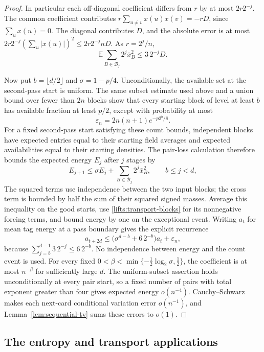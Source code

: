 \begin{proof}
In particular each off-diagonal coefficient differs from $r$ by at
most $2r2^{-j}$. The common coefficient contributes
$r\sum_{u\ne v}x(u)x(v)=-rD$, since $\sum_u x(u)=0$.
The diagonal contributes $D$, and the absolute error is at most
$2r2^{-j}(\sum_u|x(u)|)^2\le2r2^{-j}nD$. As $r=2^j/n$,
\begin{equation}
 \mathbb E\sum_{B\in\mathcal B_j}2^j\bar x_B^2\le3\,2^{-j}D.
 \label{lifts:transport-blocks}
\end{equation}

Now put $b=\lfloor d/2\rfloor$ and $\sigma=1-p/4$.
Unconditionally, the available set at the second-pass start is uniform.
The same subset estimate used above and a union bound over fewer than
$2n$ blocks show that every starting block of level at least $b$ has
available fraction at least $p/2$, except with probability at most
\[
 \varepsilon_n=2n(n+1)e^{-p2^b/8}.
\]
For a fixed second-pass start satisfying these count bounds, independent
blocks have expected entries equal to their starting field averages
and expected availabilities equal to their starting densities.
The pair-loss calculation therefore bounds the expected energy $E_j$
after $j$ stages by
\begin{equation}
 E_{j+1}\le\sigma E_j+\sum_{B\in\mathcal B_j}2^j\bar x_B^2,
 \qquad b\le j<d,
 \label{lifts:transport-stage}
\end{equation}
The squared terms use independence between the two input blocks; the
cross term is bounded by half the sum of their squared signed masses.
Average this inequality on the good starts, use
\eqref{lifts:transport-blocks} for its nonnegative forcing terms, and
bound energy by one on the exceptional event. Writing $a_t$ for mean
tag energy at a pass boundary gives the explicit recurrence
\[
 a_{t+2d}\le\bigl(\sigma^{d-b}+6\,2^{-b}\bigr)a_t+\varepsilon_n,
\]
because $\sum_{j=b}^{d-1}3\,2^{-j}\le6\,2^{-b}$.
No independence between energy and the count event is used.
For every fixed
$0<\beta<\min\{-\tfrac12\log_2\sigma,\tfrac12\}$, the coefficient
is at most $n^{-\beta}$ for sufficiently large $d$.
The uniform-subset assertion holds unconditionally at every pair start,
so a fixed number of pairs with total exponent greater than four gives
expected energy $o(n^{-4})$. Cauchy--Schwarz makes each next-card
conditional variation error $o(n^{-1})$, and Lemma~\ref{lem:sequential-tv}
sums these errors to $o(1)$.
\end{proof}

\subsection{The entropy and transport applications}
\label{lifts:cycle-applications}

